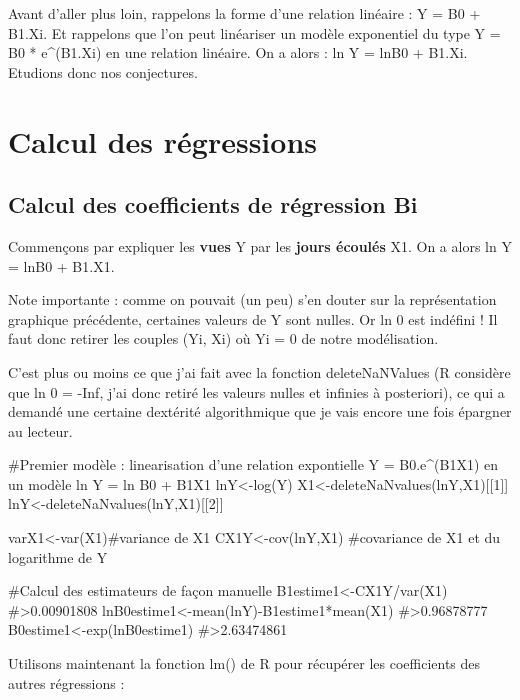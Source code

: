 Avant d'aller plus loin, rappelons la forme d'une relation linéaire : Y
= B0 + B1.Xi. Et rappelons que l'on peut linéariser un modèle
exponentiel du type Y = B0 * e\^{}(B1.Xi) en une relation linéaire. On a
alors : ln Y = lnB0 + B1.Xi. Etudions donc nos conjectures.

\hypertarget{calcul-des-ruxe9gressions}{%
\section{Calcul des régressions}\label{calcul-des-ruxe9gressions}}

\hypertarget{calcul-des-coefficients-de-ruxe9gression-bi}{%
\subsection{Calcul des coefficients de régression
Bi}\label{calcul-des-coefficients-de-ruxe9gression-bi}}

Commençons par expliquer les \textbf{vues} Y par les \textbf{jours
écoulés} X1. On a alors ln Y = lnB0 + B1.X1.

Note importante : comme on pouvait (un peu) s'en douter sur la
représentation graphique précédente, certaines valeurs de Y sont nulles.
Or ln 0 est indéfini ! Il faut donc retirer les couples (Yi, Xi) où Yi =
0 de notre modélisation.

C'est plus ou moins ce que j'ai fait avec la fonction deleteNaNValues (R
considère que ln 0 = -Inf, j'ai donc retiré les valeurs nulles et
infinies à posteriori), ce qui a demandé une certaine dextérité
algorithmique que je vais encore une fois épargner au lecteur.

\begin{Schunk}
\begin{Sinput}
#Premier modèle : linearisation d'une relation expontielle Y = B0.e^(B1X1) en un modèle ln Y = ln B0 + B1X1
lnY<-log(Y)
X1<-deleteNaNvalues(lnY,X1)[[1]]
lnY<-deleteNaNvalues(lnY,X1)[[2]]

varX1<-var(X1)#variance de X1
CX1Y<-cov(lnY,X1) #covariance de X1 et du logarithme de Y

#Calcul des estimateurs de façon manuelle
B1estime1<-CX1Y/var(X1)
#>0.00901808
lnB0estime1<-mean(lnY)-B1estime1*mean(X1)
#>0.96878777
B0estime1<-exp(lnB0estime1)
#>2.63474861
\end{Sinput}
\end{Schunk}

Utilisons maintenant la fonction lm() de R pour récupérer les
coefficients des autres régressions :

